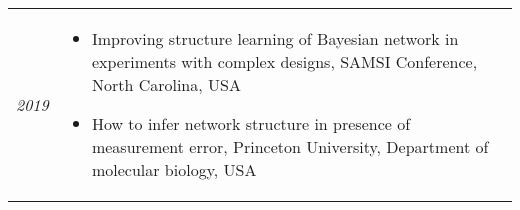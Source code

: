 \documentclass[11pt]{article}
\newcommand{\entry}[2]{{\emph{#1}}&{ #2 }\\[0.22cm]}
\begin{document}
\vspace{-.25cm}
\begin{tabular}{@{}p{1.5cm}p{14.5cm}}
\entry{2019}{{}
\begin{itemize} 
\vspace{-0.25cm}
   \item Improving structure learning of Bayesian network in experiments with complex designs, SAMSI Conference, North Carolina, USA
   \item How to infer network structure in presence of measurement error, Princeton University, Department of molecular biology, USA
   \end{itemize}
   \vspace{-0.25cm}
}
\end{tabular}




\end{document}
